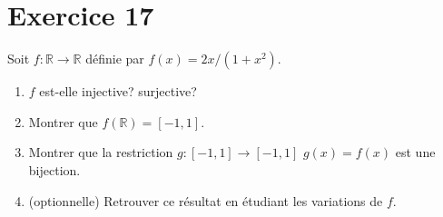 \documentclass{report}
\begin{document}


\section{Exercice 17}
\qs{}
{
  Soit $f  : \mathbb{R} \rightarrow \mathbb{R}$ d\'efinie par $f(x) = 2x/(1+x^2)$.
\begin{enumerate}
    \item $f$ est-elle injective? surjective?
    \item Montrer que $f(\mathbb{R})=[-1,1]$.
    \item Montrer que la restriction $g  : [-1,1] \rightarrow [-1,1]$  $g(x) = f(x)$
est une bijection.
    \item (optionnelle) Retrouver ce r\'esultat en \'etudiant les variations de $f$.
\end{enumerate}
}
\end{document}
